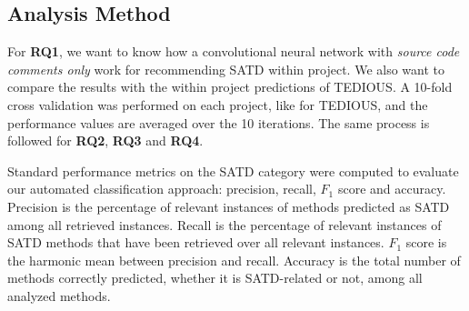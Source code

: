 \subsection{Analysis Method}


\begin{table}[t]
	\caption{Within-project prediction: results of CNN for each system using source code comments only}
	\label{tab:commentsonly}
	\centering\tiny
	\vspace{-3mm}
\end{table}

For \textbf{RQ1}, we want to know how a convolutional neural network with \emph{source code comments only} work for recommending SATD within project. We also want to compare the results with the within project predictions of TEDIOUS. A 10-fold cross validation was performed on each project, like for TEDIOUS, and the performance values are averaged over the 10 iterations. The same process is followed for \textbf{RQ2}, \textbf{RQ3} and \textbf{RQ4}.

Standard performance metrics on the SATD category were computed to evaluate our automated classification approach: precision, recall, $F_1$ score and accuracy. Precision is the percentage of relevant instances of methods predicted as SATD among all retrieved instances. Recall is the percentage of relevant instances of SATD methods that have been retrieved over all relevant instances. $F_1$ score is the harmonic mean between precision and recall. Accuracy is the total number of methods correctly predicted, whether it is SATD-related or not, among all analyzed methods. 

